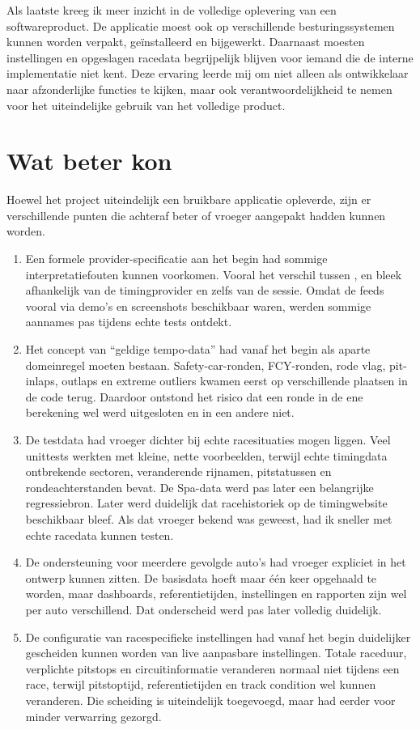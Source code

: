 Als laatste kreeg ik meer inzicht in de volledige oplevering van een softwareproduct. De applicatie moest ook op verschillende besturingssystemen kunnen worden verpakt, geïnstalleerd en bijgewerkt. Daarnaast moesten instellingen en opgeslagen racedata begrijpelijk blijven voor iemand die de interne implementatie niet kent. Deze ervaring leerde mij om niet alleen als ontwikkelaar naar afzonderlijke functies te kijken, maar ook verantwoordelijkheid te nemen voor het uiteindelijke gebruik van het volledige product.

\section{Wat beter kon}
Hoewel het project uiteindelijk een bruikbare applicatie opleverde, zijn er verschillende punten die
achteraf beter of vroeger aangepakt hadden kunnen worden.

\begin{enumerate}
  \item Een formele provider-specificatie aan het begin had sommige interpretatiefouten kunnen
  voorkomen. Vooral het verschil tussen ,  en  bleek afhankelijk van de
  timingprovider en zelfs van de sessie. Omdat de feeds vooral via demo's en screenshots beschikbaar
  waren, werden sommige aannames pas tijdens echte tests ontdekt.

  \item Het concept van ``geldige tempo-data'' had vanaf het begin als aparte domeinregel moeten
  bestaan. Safety-car-ronden, FCY-ronden, rode vlag, pit-inlaps, outlaps en extreme outliers kwamen
  eerst op verschillende plaatsen in de code terug. Daardoor ontstond het risico dat een ronde in de
  ene berekening wel werd uitgesloten en in een andere niet.

  \item De testdata had vroeger dichter bij echte racesituaties mogen liggen. Veel unittests werkten
  met kleine, nette voorbeelden, terwijl echte timingdata ontbrekende sectoren, veranderende
  rijnamen, pitstatussen en rondeachterstanden bevat. De Spa-data werd pas later een belangrijke
  regressiebron. Later werd duidelijk dat racehistoriek op de timingwebsite beschikbaar bleef. Als
  dat vroeger bekend was geweest, had ik sneller met echte racedata kunnen testen.

  \item De ondersteuning voor meerdere gevolgde auto's had vroeger expliciet in het ontwerp kunnen
  zitten. De basisdata hoeft maar één keer opgehaald te worden, maar dashboards, referentietijden,
  instellingen en rapporten zijn wel per auto verschillend. Dat onderscheid werd pas later volledig
  duidelijk.

  \item De configuratie van racespecifieke instellingen had vanaf het begin duidelijker gescheiden
  kunnen worden van live aanpasbare instellingen. Totale raceduur, verplichte pitstops en
  circuitinformatie veranderen normaal niet tijdens een race, terwijl pitstoptijd, referentietijden
  en track condition wel kunnen veranderen. Die scheiding is uiteindelijk toegevoegd, maar had eerder
  voor minder verwarring gezorgd.
\end{enumerate}

